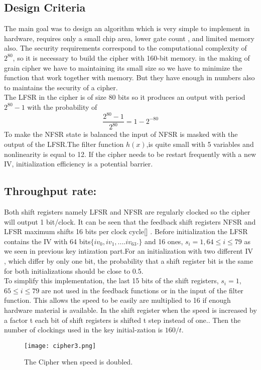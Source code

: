 \subsection{Design Criteria}
The main goal was to design an algorithm which is very simple to implement in hardware, requires only a small chip area, lower gate count , and limited memory also.
The security requirements correspond to the computational complexity of $2 ^ {80}$, so it is necessary to build the cipher with  160-bit memory.
in the making of grain cipher we have to  maintaining its small size so we have to minimize the function that work together with memory. But they have enough in numbers also to maintains the security of a  cipher.
\\[1mm]
The LFSR in the cipher is of size 80 bits so it produces an output with period $2^{80} - 1$ with the probability of 
\begin{equation}
\frac{2^{80}-1}{2^{80}}=1-2^{-80}
\end{equation}
To make  the NFSR state is balanced the input of NFSR is masked with the output of the LFSR.The filter function $h(x)$,is quite small with 5 variables and nonlinearity is equal to 12. If the cipher needs to be restart frequently with a  new IV, initialization efficiency  is a potential barrier.

\subsection{Throughput rate:}
Both shift registers namely LFSR and NFSR are regularly clocked so the cipher will output 1 bit/clock.  It can be seen that the feedback shift registers NFSR and LFSR maximum shifts 16 bits per clock cycle[\cite{feldhofer2007comparison}] .
Before initialization the LFSR contains the IV with 64 bits$\{iv_0,iv_1,....iv_{63}.\}$ and 16 ones, $s_i=1, 64 \leq i \leq 79$ as we seen in previous key intization part.For an initialization with two  different IV 
, which differ by only one bit, the probability that a shift register bit 
is the same for both initializations should be close to 0.5.\\[2mm]
To simplify this implementation, the last 15 bits of the shift registers, $s_i=1$, $65 \leq i \leq 79$ are not used in the feedback functions or in the input of the filter function. This allows the speed to be easily are multiplied to 16 if enough hardware material is available.
In the shift register when the speed is increased by a factor t each bit of shift registers is shifted t step instead of one.. Then the number of clockings used in the key initial-zation is $160/t$.
\begin{figure}[h]
	\centering
	\texttt{[image: cipher3.png]}
	\caption{The Cipher when speed is doubled.}
\end{figure}

